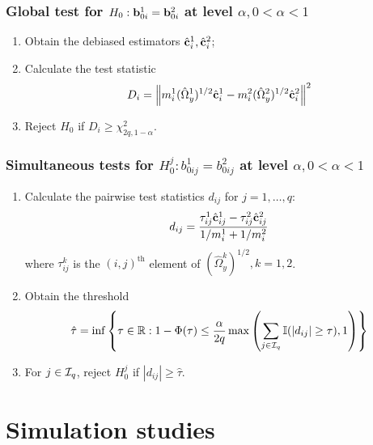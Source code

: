 \documentclass[10pt]{beamer}
\theoremstyle{definition}
\DeclareMathOperator*{\Th}{\text{th}}
\begin{document}
\begin{frame}
\frametitle{Global test for $H_0: {\bf{b}}_{0 i}^1 = {\bf{b}}_{0 i}^2$ at level $\alpha, 0< \alpha< 1$}
\begin{enumerate}
\item Obtain the debiased estimators $\hat {{\bf{c}}}_i^1, \hat {{\bf{c}}}_i^2$;

\item Calculate the test statistic
%
$$
D_i = \left\| m_i^1 (\hat \Omega_y^1)^{1/2} \hat {{\bf{c}}}_i^1 - 
 m_i^2 (\hat \Omega_y^2)^{1/2} \hat {{\bf{c}}}_i^2 \right\|^2
$$
%

\item Reject $H_0$ if $D_i \geq \chi^2_{2q, 1-\alpha}$.
\end{enumerate}
\end{frame}

\begin{frame}
\frametitle{Simultaneous tests for $H_0^{j}: b_{0 ij}^1 = b_{0 ij}^2$ at level $\alpha, 0< \alpha< 1$}

\begin{enumerate}
\item Calculate the pairwise test statistics $d_{ij}$ for $j = 1, \ldots, q$:
%
\[
d_{ij} = \frac{\tau_{ij}^1 \hat {{\bf{c}}}_{ij}^1 - \tau_{ij}^2 \hat {{\bf{c}}}_{ij}^2}{1/m_i^1 + 1/m_i^2}
\]
%
where $\tau_{ij}^k$ is the $(i,j)^{\Th}$ element of $(\hat \Omega_y^k)^{1/2}, k=1,2$.

\item Obtain the threshold
%
$$
\hat \tau = \inf \left\{\tau \in {\mathbb{R}}: 1 - \Phi(\tau) \leq \frac{\alpha}{2 q}
\max \left( \sum_{j \in {\cal{I}}_q} {\mathbb{I}}( |d_{ij}| \geq \tau), 1 \right) \right\}
$$
%

\item For $j \in {\cal{I}}_q$, reject $H_0^{j}$ if $|d_{ij}| \geq \hat \tau$.
\end{enumerate} 

\end{frame}
\section{Simulation studies}
\end{document}
